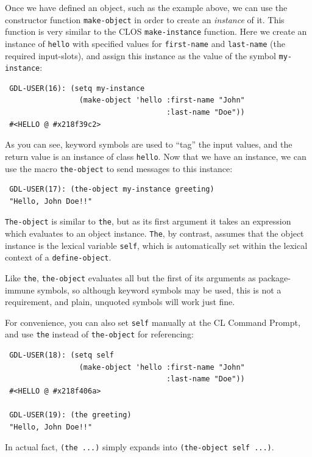\documentclass [11pt]{book}
\begin{document}
Once we have defined an object, such as the example above, we can use
the constructor function \texttt{make-object} in order to create an \emph{instance} of it. This function is very similar to the CLOS \texttt{make-instance} function. Here we create an instance of \texttt{hello} with specified values for \texttt{first-name} and \texttt{last-name} (the required input-slots), and assign this instance as the value of the symbol \texttt{my-instance}:

\begin{verbatim}
 GDL-USER(16): (setq my-instance
                 (make-object 'hello :first-name "John" 
                                     :last-name "Doe"))
 #<HELLO @ #x218f39c2>
\end{verbatim}As you can see, keyword symbols are used to ``tag'' the input values, and the return value is an instance of class \texttt{hello}. Now that we have an instance, we can use the macro \texttt{the-object} to send messages to this instance:

\begin{verbatim}
 GDL-USER(17): (the-object my-instance greeting)
 "Hello, John Doe!!"
\end{verbatim}\texttt{The-object} is similar to \texttt{the}, but as its first argument it takes an expression which evaluates to an
object instance. \texttt{The}, by contrast, assumes that the object instance is the lexical variable \texttt{self}, which is automatically set within the lexical context of a \texttt{define-object}.

Like \texttt{the}, \texttt{the-object} evaluates all but the first of its arguments as package-immune symbols,
so although keyword symbols may be used, this is not a requirement, and plain,
unquoted symbols will work just fine.

For convenience, you can also set \texttt{self} manually at the CL Command Prompt, and use \texttt{the} instead of \texttt{the-object} for referencing:

\begin{verbatim}
 GDL-USER(18): (setq self 
                 (make-object 'hello :first-name "John" 
                                     :last-name "Doe"))
 #<HELLO @ #x218f406a>

 GDL-USER(19): (the greeting)
 "Hello, John Doe!!"
\end{verbatim}In actual fact, \texttt{(the ...)} simply expands into \texttt{(the-object self ...)}.
\end{document}
